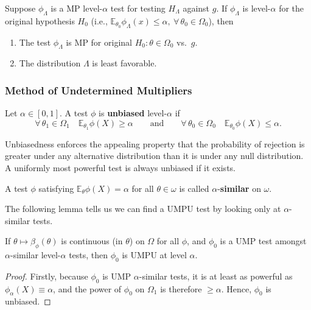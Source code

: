 \begin{thm}
Suppose $\phi_\Lambda$ is a MP level-$\alpha$ test for testing $H_\Lambda$ against 
$g$. If $\phi_\Lambda$ is level-$\alpha$ for the original hypothesis $H_0$ (i.e., 
$\mathbb{E}_{\theta_0}\phi_\Lambda(x) \le \alpha,\ \forall\, \theta_0 \in \Omega_0$), 
then
\begin{enumerate}
  \item The test $\phi_\Lambda$ is MP for original $H_0 : \theta \in \Omega_0$ vs.\ 
  $g$.
  \item The distribution $\Lambda$ is least favorable.
\end{enumerate}
\end{thm}

\subsubsection{Method of Undetermined Multipliers}
\begin{defn}[Unbiasedness]
Let $\alpha \in [0,1]$. A test $\phi$ is \textbf{unbiased} level-$\alpha$ if
\[
  \forall\, \theta_1 \in \Omega_1 \quad \mathbb{E}_{\theta_1}\phi(X) \ge \alpha 
  \qquad \text{and} \qquad 
  \forall\, \theta_0 \in \Omega_0 \quad \mathbb{E}_{\theta_0}\phi(X) \le \alpha.
\]
\end{defn}
Unbiasedness enforces the appealing property that the probability of rejection is greater under any alternative distribution than it is under any null distribution. A uniformly most powerful test is always unbiased if it exists.

\begin{defn}
A test $\phi$ satisfying $\mathbb{E}_\theta \phi(X) = \alpha$ for all 
$\theta \in \omega$ is called $\alpha$-\textbf{similar} on $\omega$.
\end{defn}

The following lemma tells us we can find a UMPU test by looking only at 
$\alpha$-similar tests.

\begin{lem}
If $\theta \mapsto \beta_\phi(\theta)$ is continuous (in $\theta$) on $\Omega$ for 
all $\phi$, and $\phi_0$ is a UMP test amongst $\alpha$-similar level-$\alpha$ tests, 
then $\phi_0$ is UMPU at level $\alpha$.
\end{lem}

\begin{proof}
Firstly, because $\phi_0$ is UMP $\alpha$-similar tests, it is at least as powerful 
as $\phi_\alpha(X) \equiv \alpha$, and the power of $\phi_0$ on $\Omega_1$ is 
therefore $\ge \alpha$. Hence, $\phi_0$ is unbiased.
\end{proof}

